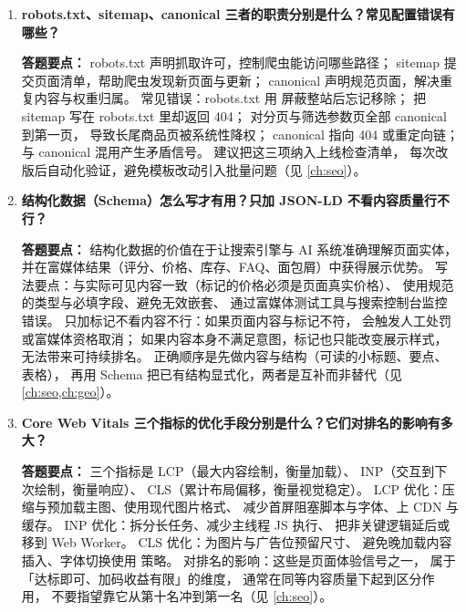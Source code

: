 \begin{interview}[题库与答题要点]
\begin{enumerate}[label=]
  \item[\textcolor{VioletDeep}{\textbf{Q81.}}] \textbf{robots.txt、sitemap、canonical 三者的职责分别是什么？常见配置错误有哪些？}
\par\smallskip\noindent\textcolor{VioletDeep}{\textbf{答题要点：}}
robots.txt 声明抓取许可，控制爬虫能访问哪些路径；
sitemap 提交页面清单，帮助爬虫发现新页面与更新；
canonical 声明规范页面，解决重复内容与权重归属。
常见错误：robots.txt 用  屏蔽整站后忘记移除；
把 sitemap 写在 robots.txt 里却返回 404；
对分页与筛选参数页全部 canonical 到第一页，
导致长尾商品页被系统性降权；
canonical 指向 404 或重定向链；
 与 canonical 混用产生矛盾信号。
建议把这三项纳入上线检查清单，
每次改版后自动化验证，避免模板改动引入批量问题（见 \cref{ch:seo}）。

  \item[\textcolor{VioletDeep}{\textbf{Q82.}}] \textbf{结构化数据（Schema）怎么写才有用？只加 JSON-LD 不看内容质量行不行？}
\par\smallskip\noindent\textcolor{VioletDeep}{\textbf{答题要点：}}
结构化数据的价值在于让搜索引擎与 AI 系统准确理解页面实体，
并在富媒体结果（评分、价格、库存、FAQ、面包屑）中获得展示优势。
写法要点：与实际可见内容一致（标记的价格必须是页面真实价格）、
使用规范的类型与必填字段、避免无效嵌套、
通过富媒体测试工具与搜索控制台监控错误。
只加标记不看内容不行：如果页面内容与标记不符，
会触发人工处罚或富媒体资格取消；
如果内容本身不满足意图，标记也只能改变展示样式，无法带来可持续排名。
正确顺序是先做内容与结构（可读的小标题、要点、表格），
再用 Schema 把已有结构显式化，两者是互补而非替代（见 \cref{ch:seo,ch:geo}）。

  \item[\textcolor{VioletDeep}{\textbf{Q83.}}] \textbf{Core Web Vitals 三个指标的优化手段分别是什么？它们对排名的影响有多大？}
\par\smallskip\noindent\textcolor{VioletDeep}{\textbf{答题要点：}}
三个指标是 LCP（最大内容绘制，衡量加载）、
INP（交互到下次绘制，衡量响应）、
CLS（累计布局偏移，衡量视觉稳定）。
LCP 优化：压缩与预加载主图、使用现代图片格式、
减少首屏阻塞脚本与字体、上 CDN 与缓存。
INP 优化：拆分长任务、减少主线程 JS 执行、
把非关键逻辑延后或移到 Web Worker。
CLS 优化：为图片与广告位预留尺寸、
避免晚加载内容插入、字体切换使用  策略。
对排名的影响：这些是页面体验信号之一，
属于「达标即可、加码收益有限」的维度，
通常在同等内容质量下起到区分作用，
不要指望靠它从第十名冲到第一名（见 \cref{ch:seo}）。


\end{enumerate}
\end{interview}
